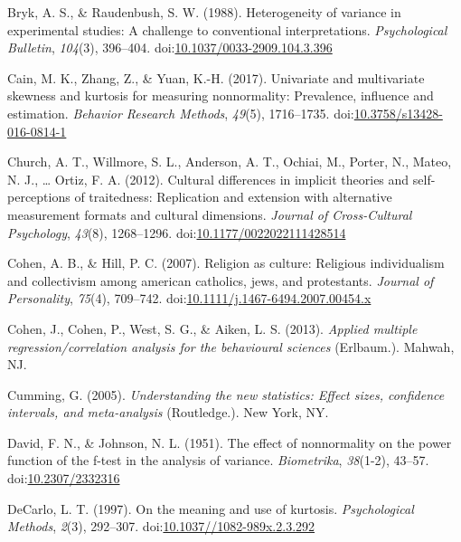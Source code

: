 \documentclass[man,floatsintext]{apa6}
\begin{document}
\leavevmode\hypertarget{ref-Bryk_and_Raudenbush_1988}{}%
Bryk, A. S., \& Raudenbush, S. W. (1988). Heterogeneity of variance in experimental studies: A challenge to conventional interpretations. \emph{Psychological Bulletin}, \emph{104}(3), 396--404. doi:\href{https://doi.org/10.1037/0033-2909.104.3.396}{10.1037/0033-2909.104.3.396}

\leavevmode\hypertarget{ref-Cain_et_al_2016}{}%
Cain, M. K., Zhang, Z., \& Yuan, K.-H. (2017). Univariate and multivariate skewness and kurtosis for measuring nonnormality: Prevalence, influence and estimation. \emph{Behavior Research Methods}, \emph{49}(5), 1716--1735. doi:\href{https://doi.org/10.3758/s13428-016-0814-1}{10.3758/s13428-016-0814-1}

\leavevmode\hypertarget{ref-Church_et_al_2012}{}%
Church, A. T., Willmore, S. L., Anderson, A. T., Ochiai, M., Porter, N., Mateo, N. J., \ldots{} Ortiz, F. A. (2012). Cultural differences in implicit theories and self-perceptions of traitedness: Replication and extension with alternative measurement formats and cultural dimensions. \emph{Journal of Cross-Cultural Psychology}, \emph{43}(8), 1268--1296. doi:\href{https://doi.org/10.1177/0022022111428514}{10.1177/0022022111428514}

\leavevmode\hypertarget{ref-Cohen_and_Hill_2007}{}%
Cohen, A. B., \& Hill, P. C. (2007). Religion as culture: Religious individualism and collectivism among american catholics, jews, and protestants. \emph{Journal of Personality}, \emph{75}(4), 709--742. doi:\href{https://doi.org/10.1111/j.1467-6494.2007.00454.x\%20}{10.1111/j.1467-6494.2007.00454.x }

\leavevmode\hypertarget{ref-Cohen_et_al_2013}{}%
Cohen, J., Cohen, P., West, S. G., \& Aiken, L. S. (2013). \emph{Applied multiple regression/correlation analysis for the behavioural sciences} (Erlbaum.). Mahwah, NJ.

\leavevmode\hypertarget{ref-Cumming_2013}{}%
Cumming, G. (2005). \emph{Understanding the new statistics: Effect sizes, confidence intervals, and meta-analysis} (Routledge.). New York, NY.

\leavevmode\hypertarget{ref-David_and_Johnson_1951}{}%
David, F. N., \& Johnson, N. L. (1951). The effect of nonnormality on the power function of the f-test in the analysis of variance. \emph{Biometrika}, \emph{38}(1-2), 43--57. doi:\href{https://doi.org/10.2307/2332316}{10.2307/2332316}

\leavevmode\hypertarget{ref-DeCarlo_1997}{}%
DeCarlo, L. T. (1997). On the meaning and use of kurtosis. \emph{Psychological Methods}, \emph{2}(3), 292--307. doi:\href{https://doi.org/10.1037//1082-989x.2.3.292}{10.1037//1082-989x.2.3.292}
\end{document}
